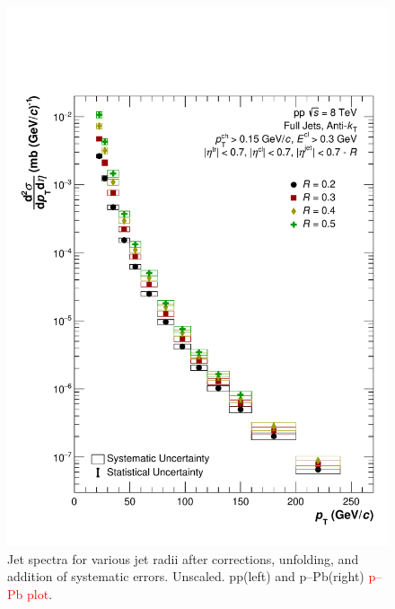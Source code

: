 \documentclass[ALICE]{ALICE_analysis_notes}
\newcommand{\pPb}{{\mbox{p--Pb}}\xspace}
\newcommand{\pp}{pp\xspace}
\begin{document}
\begin{figure}
    \centering
    \includegraphics[width=15cm]{figures/FinalResults/Bayes_reg6_unscaled.pdf}
    \caption{Jet spectra for various jet radii after corrections, unfolding, and addition of systematic errors. Unscaled. \pp (left) and \pPb (right) \textcolor{red}{\pPb plot}.}
    \label{fig:finalSpectraUnscaled}
\end{figure}
\end{document}
